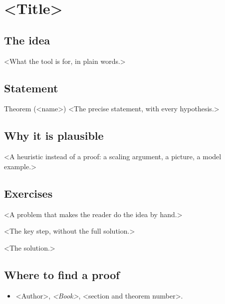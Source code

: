 %
%

\section{<Title>}\label{p:<id>}


\subsection*{The idea}

<What the tool is for, in plain words.>

\subsection*{Statement}

\begin{thmbox}{Theorem (<name>)}
<The precise statement, with every hypothesis.>
\end{thmbox}

\subsection*{Why it is plausible}

<A heuristic instead of a proof: a scaling argument, a picture, a model example.>

\subsection*{Exercises}

\begin{exercise}
  <A problem that makes the reader do the idea by hand.>
  \begin{hint}
    <The key step, without the full solution.>
  \end{hint}
  \begin{solution}
    <The solution.>
  \end{solution}
\end{exercise}

\subsection*{Where to find a proof}

\begin{itemize}
\item <Author>, \emph{<Book>}, <section and theorem number>.
\end{itemize}

\neededfor                          %
